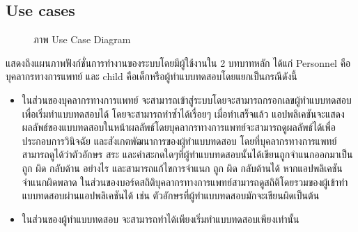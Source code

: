 \documentclass[12pt,oneside,openright,a4paper]{cpe-thai-project}
\begin{document}
\subsection{Use cases}
\begin{figure}[!ht]\centering
  \setlength{\fboxrule}{0.2mm} %
  \setlength{\fboxsep}{1cm}
  \caption{ภาพ Use Case Diagram}\label{fig:usecase}
\end{figure}
แสดงถึงแผนภาพฟังก์ชั่นการทำงานของระบบโดยมีผู้ใช้งานใน 2 บทบาทหลัก ได้แก่ Personnel คือบุคลากรทางการแพทย์ และ child คือเด็กหรือผู้ทำแบบทดสอบโดยแยกเป็นกรณีดังนี้
\begin{itemize}
  \item ในส่วนของบุคลากรทางการแพทย์ จะสามารถเข้าสู่ระบบโดยจะสามารถกรอกเลขผู้ทำแบบทดสอบเพื่อเริ่มทำแบบทดสอบได้ โดยจะสามารถทำซ้ำได้เรื่อยๆ เมื่อทำเสร็จแล้ว แอปพลิเคชันจะแสดงผลลัพธ์ของแบบทดสอบในหน้าผลลัพธ์โดยบุคลากรทางการแพทย์จะสามารถดูผลลัพธ์ได้เพื่อประกอบการวินิจฉัย และสังเกตพัฒนาการของผู้ทำแบบทดสอบ โดยที่บุคลากรทางการแพทย์สามารถดูได้ว่าตัวอักษร สระ และคำสะกดใดๆที่ผู้ทำแบบทดสอบนั้นได้เขียนถูกจำแนกออกมาเป็น ถูก ผิด กลับด้าน อย่างไร และสามารถแก้ไขการจำแนก 
  ถูก ผิด กลับด้านได้ หากแอปพลิเคชันจำแนกผิดพลาด ในส่วนของบอร์ดสถิติบุคลากรทางการแพทย์สามารถดูสถิติโดยรวมของผู้เข้าทำแบบทดสอบผ่านแอปพลิเคชันได้ เช่น ตัวอักษรที่ผู้ทำแบบทดสอบมักจะเขียนผิดเป็นต้น 
  \item ในส่วนของผู้ทำแบบทดสอบ จะสามารถทำได้เพียงเริ่มทำแบบทดสอบเพียงเท่านั้น 
\end{itemize}
\end{document}
